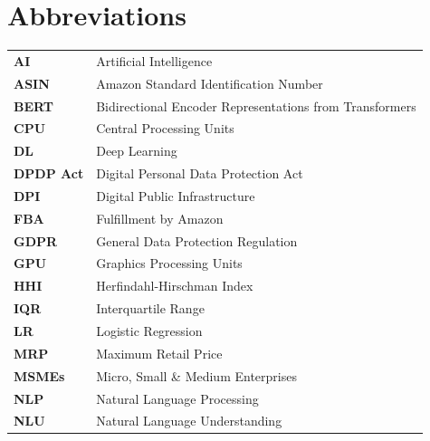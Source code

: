 \documentclass[authoryear,review,3p,times,12pt]{elsarticle}
\begin{document}
\section*{Abbreviations}
\begin{table}[htpb]
\scriptsize
\begin{tabular}{ll}
\textbf{AI}       & Artificial Intelligence                                 \\
\textbf{ASIN}     & Amazon Standard Identification Number                   \\
\textbf{BERT}     & Bidirectional Encoder Representations from Transformers \\
\textbf{CPU}      & Central Processing Units                                \\
\textbf{DL}       & Deep Learning                                           \\
\textbf{DPDP Act} & Digital Personal Data Protection Act                    \\
\textbf{DPI}      & Digital Public Infrastructure                           \\
\textbf{FBA}      & Fulfillment by Amazon                                   \\
\textbf{GDPR}     & General Data Protection Regulation                      \\
\textbf{GPU}      & Graphics Processing Units                               \\
\textbf{HHI}      & Herfindahl-Hirschman Index                              \\
\textbf{IQR}      & Interquartile Range                                     \\
\textbf{LR}       & Logistic Regression                                     \\
\textbf{MRP}      & Maximum Retail Price                                    \\
\textbf{MSMEs}    & Micro, Small \& Medium Enterprises                      \\
\textbf{NLP}      & Natural Language Processing                             \\
\textbf{NLU}      & Natural Language Understanding                          \\

\end{tabular}
\end{table}
\end{document}
